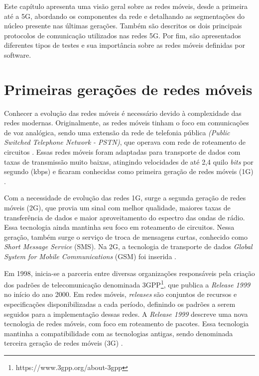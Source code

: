 Este capítulo apresenta uma visão geral sobre as redes móveis, desde a primeira até a 5G, abordando os componentes da rede e detalhando as segmentações do núcleo presente nas últimas gerações. Também são descritos os dois principais protocolos de comunicação utilizados nas redes 5G. Por fim, são apresentados diferentes tipos de testes e sua importância sobre as redes móveis definidas por software. 

\section{Primeiras gerações de redes móveis}

Conhecer a evolução das redes móveis é necessário devido à complexidade das redes modernas.
Originalmente, as redes móveis tinham o foco em comunicações de voz analógica, sendo uma extensão da rede de telefonia pública \textit{(Public Switched Telephone Network - PSTN)}, que operava com rede de roteamento de circuitos \cite{Cardoso2020}.
Essas redes móveis foram adaptadas para transporte de dados com taxas de transmissão muito baixas, atingindo velocidades de até 2,4 quilo \textit{bits} por segundo (kbps) e ficaram conhecidas como primeira geração de redes móveis (1G) \cite{vora2015evolution}.

Com a necessidade de evolução das redes 1G, surge a segunda geração de redes móveis (2G), que provia um sinal com melhor qualidade, maiores taxas de transferência de dados e maior aproveitamento do espectro das ondas de rádio.
Essa tecnologia ainda mantinha seu foco em roteamento de circuitos.
Nessa geração, também surge o serviço de troca de mensagens curtas, conhecido como \textit{Short Message Service} (SMS).
Na 2G, a tecnologia de transporte de dados \textit{Global System for Mobile Communications} (GSM) foi inserida \cite{bhalla2010generations}.

Em 1998, inicia-se a parceria entre diversas organizações responsáveis pela criação dos padrões de telecomunicação denominada 3GPP\footnote{https://www.3gpp.org/about-3gpp}, que publica a \textit{Release 1999} no início do ano 2000.
Em redes móveis, \textit{releases} são conjuntos de recursos e especificações disponibilizadas a cada período, definindo os padrões a serem seguidos para a implementação dessas redes.
A \textit{Release 1999} descreve uma nova tecnologia de redes móveis, com foco em roteamento de pacotes.
Essa tecnologia mantinha a compatibilidade com as tecnologias antigas, sendo denominada terceira geração de redes móveis (3G) \cite{3gpp.01.01}.

